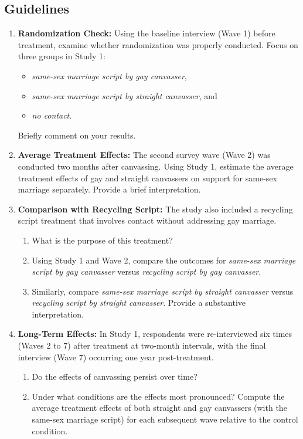 \documentclass[12pt]{article}
\begin{document}
\subsection*{Guidelines}
\begin{enumerate}
    \item \textbf{Randomization Check:} Using the baseline interview (Wave 1) before treatment, examine whether randomization was properly conducted. Focus on three groups in Study 1: 
    \begin{itemize}
        \item \textit{same-sex marriage script by gay canvasser},
        \item \textit{same-sex marriage script by straight canvasser}, and 
        \item \textit{no contact}.
    \end{itemize}
    Briefly comment on your results.
    
    \item \textbf{Average Treatment Effects:} The second survey wave (Wave 2) was conducted two months after canvassing. Using Study 1, estimate the average treatment effects of gay and straight canvassers on support for same-sex marriage separately. Provide a brief interpretation.
    
    \item \textbf{Comparison with Recycling Script:} The study also included a recycling script treatment that involves contact without addressing gay marriage. 
    \begin{enumerate}
        \item What is the purpose of this treatment?
        \item Using Study 1 and Wave 2, compare the outcomes for \textit{same-sex marriage script by gay canvasser} versus \textit{recycling script by gay canvasser}.
        \item Similarly, compare \textit{same-sex marriage script by straight canvasser} versus \textit{recycling script by straight canvasser}. Provide a substantive interpretation.
    \end{enumerate}
    
    \item \textbf{Long-Term Effects:} In Study 1, respondents were re-interviewed six times (Waves 2 to 7) after treatment at two-month intervals, with the final interview (Wave 7) occurring one year post-treatment.
    \begin{enumerate}
        \item Do the effects of canvassing persist over time?
        \item Under what conditions are the effects most pronounced? Compute the average treatment effects of both straight and gay canvassers (with the same-sex marriage script) for each subsequent wave relative to the control condition.
    \end{enumerate}
    

\end{enumerate}
\end{document}
